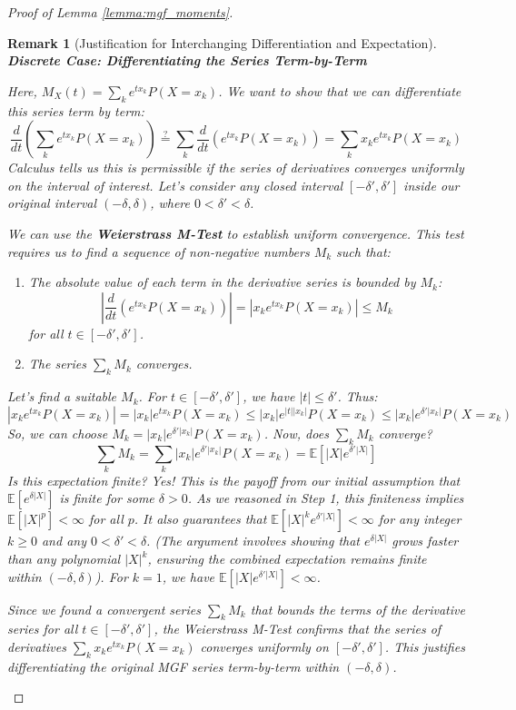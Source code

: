 \documentclass[12pt]{article}
\newtheorem{remark}[theorem]{Remark}
\begin{document}
\begin{proof}[Proof of Lemma \ref{lemma:mgf_moments}]
\begin{remark}[Justification for Interchanging Differentiation and Expectation]
\textbf{Discrete Case: Differentiating the Series Term-by-Term}

Here, $M_X(t) = \sum_{k} e^{tx_k} P(X=x_k)$. We want to show that we can differentiate this series term by term:
\[ \frac{d}{dt} \left( \sum_{k} e^{tx_k} P(X=x_k) \right) \stackrel{?}{=} \sum_{k} \frac{d}{dt} (e^{tx_k} P(X=x_k)) = \sum_{k} x_k e^{tx_k} P(X=x_k) \]
Calculus tells us this is permissible if the series of derivatives converges \textit{uniformly} on the interval of interest. Let's consider any closed interval $[-\delta', \delta']$ inside our original interval $(-\delta, \delta)$, where $0 < \delta' < \delta$.

We can use the \textbf{Weierstrass M-Test} to establish uniform convergence. This test requires us to find a sequence of non-negative numbers $M_k$ such that:
\begin{enumerate}
    \item The absolute value of each term in the derivative series is bounded by $M_k$:
          \[ \left| \frac{d}{dt} (e^{tx_k} P(X=x_k)) \right| = |x_k e^{tx_k} P(X=x_k)| \le M_k \]
          for all $t \in [-\delta', \delta']$.
    \item The series $\sum_k M_k$ converges.
\end{enumerate}
Let's find a suitable $M_k$. For $t \in [-\delta', \delta']$, we have $|t| \le \delta'$. Thus:
\[ |x_k e^{tx_k} P(X=x_k)| = |x_k| e^{tx_k} P(X=x_k) \le |x_k| e^{|t||x_k|} P(X=x_k) \le |x_k| e^{\delta'|x_k|} P(X=x_k) \]
So, we can choose $M_k = |x_k| e^{\delta'|x_k|} P(X=x_k)$. Now, does $\sum_k M_k$ converge?
\[ \sum_k M_k = \sum_k |x_k| e^{\delta'|x_k|} P(X=x_k) = \mathbb{E}[|X| e^{\delta'|X|}] \]
Is this expectation finite? Yes! This is the payoff from our initial assumption that $\mathbb{E}[e^{\delta|X|}]$ is finite for some $\delta > 0$. As we reasoned in Step 1, this finiteness implies $\mathbb{E}[|X|^p] < \infty$ for all $p$. It also guarantees that $\mathbb{E}[|X|^k e^{\delta'|X|}] < \infty$ for any integer $k \ge 0$ and any $0 < \delta' < \delta$. (The argument involves showing that $e^{\delta|X|}$ grows faster than any polynomial $|X|^k$, ensuring the combined expectation remains finite within $(-\delta, \delta)$). For $k=1$, we have $\mathbb{E}[|X| e^{\delta'|X|}] < \infty$.

Since we found a convergent series $\sum_k M_k$ that bounds the terms of the derivative series for all $t \in [-\delta', \delta']$, the Weierstrass M-Test confirms that the series of derivatives $\sum_k x_k e^{tx_k} P(X=x_k)$ converges uniformly on $[-\delta', \delta']$. This justifies differentiating the original MGF series term-by-term within $(-\delta, \delta)$.


\end{remark}
\end{proof}
\end{document}

